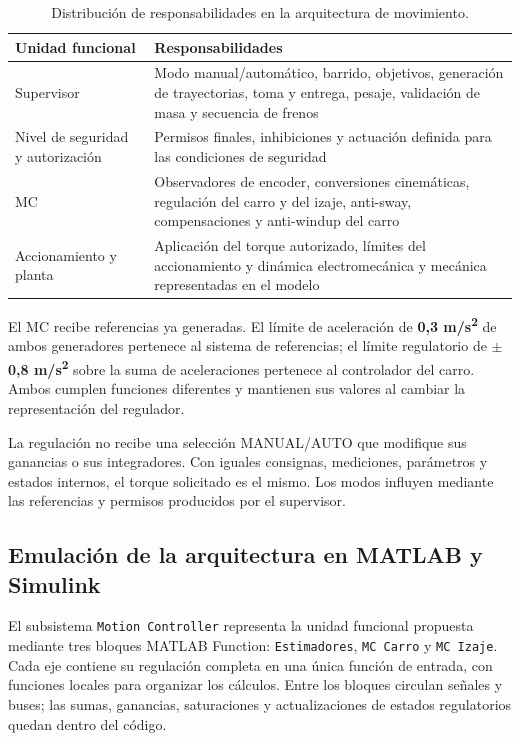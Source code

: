 \documentclass[a4paper,10pt,onecolumn,journal]{ieeeconf}
\numberwithin{equation}{section}
\begin{document}
\begin{table}[H]
\centering
\caption{Distribución de responsabilidades en la arquitectura de movimiento.}
\label{tab:mc_responsabilidades}
{\small
\begin{tabular}{@{}L{0.34\textwidth}L{0.60\textwidth}@{}}
\toprule
Unidad funcional & Responsabilidades\\
\midrule
Supervisor & Modo manual/automático, barrido, objetivos, generación de trayectorias, toma y entrega, pesaje, validación de masa y secuencia de frenos\\
Nivel de seguridad y autorización & Permisos finales, inhibiciones y actuación definida para las condiciones de seguridad\\
MC & Observadores de encoder, conversiones cinemáticas, regulación del carro y del izaje, anti-sway, compensaciones y anti-windup del carro\\
Accionamiento y planta & Aplicación del torque autorizado, límites del accionamiento y dinámica electromecánica y mecánica representadas en el modelo\\
\bottomrule
\end{tabular}
}
\end{table}

El MC recibe referencias ya generadas. El límite de aceleración de \textbf{0,3 m/s\textsuperscript{2}} de ambos generadores pertenece al sistema de referencias; el límite regulatorio de \textbf{\(\pm\)0,8 m/s\textsuperscript{2}} sobre la suma de aceleraciones pertenece al controlador del carro. Ambos cumplen funciones diferentes y mantienen sus valores al cambiar la representación del regulador.

La regulación no recibe una selección MANUAL/AUTO que modifique sus ganancias o sus integradores. Con iguales consignas, mediciones, parámetros y estados internos, el torque solicitado es el mismo. Los modos influyen mediante las referencias y permisos producidos por el supervisor.


\subsection{Emulación de la arquitectura en MATLAB y Simulink}

El subsistema \texttt{Motion Controller} representa la unidad funcional propuesta mediante tres bloques MATLAB Function: \texttt{Estimadores}, \texttt{MC Carro} y \texttt{MC Izaje}. Cada eje contiene su regulación completa en una única función de entrada, con funciones locales para organizar los cálculos. Entre los bloques circulan señales y buses; las sumas, ganancias, saturaciones y actualizaciones de estados regulatorios quedan dentro del código.
\end{document}
